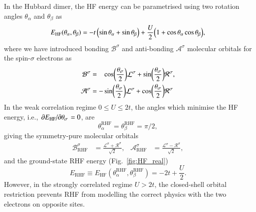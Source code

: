 \documentclass[aps,prb,reprint,noshowkeys,superscriptaddress]{revtex4-1}
\newcommand{\latin}[1]{#1}
\newcommand{\ie}{\latin{i.e.}}
\newcommand{\ta}{\theta_{\alpha}}
\newcommand{\tb}{\theta_{\beta}}
\newcommand{\Lsi}{\mathcal{L}^{\sigma}}
\newcommand{\Rsi}{\mathcal{R}^{\sigma}}
\begin{document}
In the Hubbard dimer, the HF energy can be parametrised using two rotation angles $\ta$ and $\tb$ as
\begin{equation}
E_\text{HF}(\ta, \tb) = -t\, \qty( \sin \ta + \sin \tb ) + \frac{U}{2} \qty( 1 + \cos \ta \cos \tb ),
\end{equation}
where we have introduced bonding $\mathcal{B}^{\sigma}$ and anti-bonding $\mathcal{A}^{\sigma}$ molecular orbitals for 
the spin-$\sigma$ electrons as
\begin{subequations}
\begin{align}
    \mathcal{B}^{\sigma} & = \hphantom{-} \cos(\frac{\theta_\sigma}{2}) \Lsi + \sin(\frac{\theta_\sigma}{2}) \Rsi,
	\\
	\mathcal{A}^{\sigma} & = - \sin(\frac{\theta_\sigma}{2}) \Lsi + \cos(\frac{\theta_\sigma}{2}) \Rsi
\end{align}
\label{eq:RHF_orbs}
\end{subequations}
In the weak correlation regime $0 \le U \le 2t$, the angles which minimise the HF energy, 
\ie, $\pdv*{E_\text{HF}}{\theta_\sigma} = 0$, are 
\begin{equation}
	\ta^\text{RHF} = \tb^\text{RHF} = \pi/2,
\end{equation}
giving the symmetry-pure molecular orbitals
\begin{align}
	\mathcal{B}_\text{RHF}^{\sigma} & = \frac{\Lsi + \Rsi}{\sqrt{2}},
	&
	\mathcal{A}_\text{RHF}^{\sigma} & = \frac{\Lsi - \Rsi}{\sqrt{2}},
\end{align}
and the ground-state RHF energy (Fig.~\ref{fig:HF_real})
\begin{equation}
	E_\text{RHF} \equiv E_\text{HF}(\ta^\text{RHF}, \tb^\text{RHF}) = -2t + \frac{U}{2}.
\end{equation}
However, in the strongly correlated regime $U>2t$, the closed-shell orbital restriction prevents RHF from 
modelling the correct physics with the two electrons on opposite sites.
\end{document}
